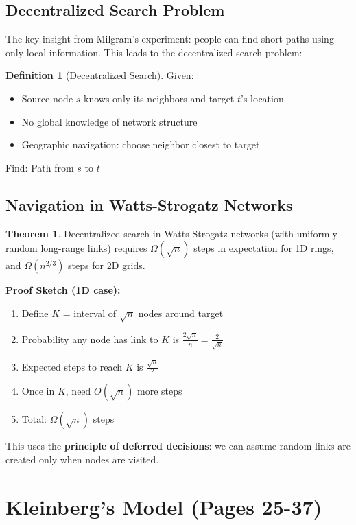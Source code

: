 \documentclass[11pt,a4paper]{article}
\theoremstyle{definition}
\newtheorem{definition}{Definition}
\newtheorem{theorem}{Theorem}
\begin{document}
\subsection{Decentralized Search Problem}
The key insight from Milgram's experiment: people can find short paths using only local information. This leads to the decentralized search problem:
\begin{definition}[Decentralized Search]
Given:
\begin{itemize}
\item Source node $s$ knows only its neighbors and target $t$'s location
\item No global knowledge of network structure
\item Geographic navigation: choose neighbor closest to target
\end{itemize}
Find: Path from $s$ to $t$
\end{definition}
\subsection{Navigation in Watts-Strogatz Networks}
\begin{theorem}
Decentralized search in Watts-Strogatz networks (with uniformly random long-range links) requires $\Omega(\sqrt{n})$ steps in expectation for 1D rings, and $\Omega(n^{2/3})$ steps for 2D grids.
\end{theorem}
\textbf{Proof Sketch (1D case):}
\begin{enumerate}
\item Define $K$ = interval of $\sqrt{n}$ nodes around target
\item Probability any node has link to $K$ is $\frac{2\sqrt{n}}{n} = \frac{2}{\sqrt{n}}$
\item Expected steps to reach $K$ is $\frac{\sqrt{n}}{2}$
\item Once in $K$, need $O(\sqrt{n})$ more steps
\item Total: $\Omega(\sqrt{n})$ steps
\end{enumerate}
This uses the \textbf{principle of deferred decisions}: we can assume random links are created only when nodes are visited.
\section{Kleinberg's Model (Pages 25-37)}
\end{document}
